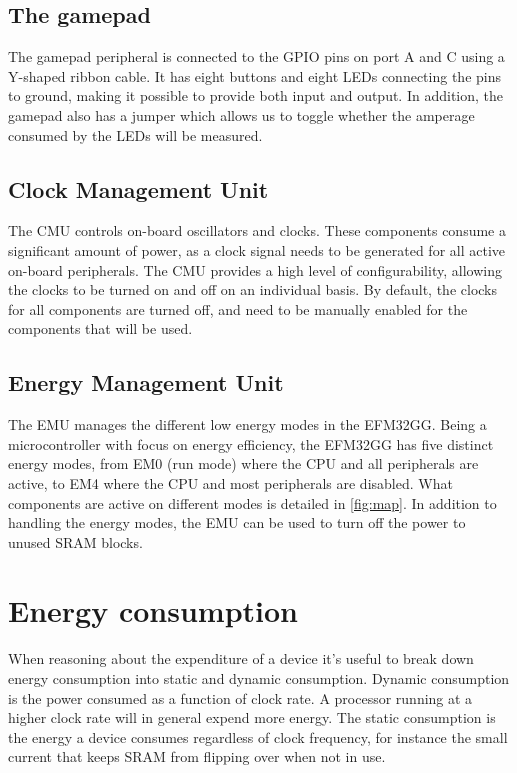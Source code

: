 \subsection{The gamepad}
The gamepad peripheral is connected to the GPIO pins on port A and C using a Y-shaped ribbon cable. It has eight buttons and eight LEDs connecting the pins to ground, making it possible to provide both input and output. In addition, the gamepad also has a jumper which allows us to toggle whether the amperage consumed by the LEDs will be measured.

\subsection{Clock Management Unit}
The CMU controls on-board oscillators and clocks. These components consume a significant amount of power, as a clock signal needs to be generated for all active on-board peripherals. The CMU provides a high level of configurability, allowing the clocks to be turned on and off on an individual basis. By default, the clocks for all components are turned off, and need to be manually enabled for the components that will be used.\cite{EFM32GG-RM}

\subsection{Energy Management Unit}
The EMU manages the different low energy modes in the EFM32GG. Being a microcontroller with focus on energy efficiency, the EFM32GG has five distinct energy modes, from EM0 (run mode) where the CPU and all peripherals are active, to EM4 where the CPU and most peripherals are disabled. What components are active on different modes is detailed in \ref{fig:map}. In addition to handling the energy modes, the EMU can be used to turn off the power to unused SRAM blocks.\cite{EFM32GG-RM}


\section{Energy consumption}

When reasoning about the expenditure of a device it’s useful to break down energy consumption into static and dynamic consumption. Dynamic consumption is the power consumed as a function of clock rate. A processor running at a higher clock rate will in general expend more energy. The static consumption is the energy a device consumes regardless of clock frequency, for instance the small current that keeps SRAM from flipping over when not in use.

